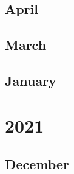 \documentclass[12pt]{article}
\begin{document}
\subsection{April}
\begin{refsection}
    \nocite{chowdhery2022palmscalinglanguagemodeling}
    \nocite{wu_inference_2025}
    \printbibliography[heading=none]
\end{refsection}

\subsection{March}
\begin{refsection}
    \nocite{ouyang_training_2022}
    \printbibliography[heading=none]
\end{refsection}


\subsection{January}
\begin{refsection}
    \nocite{wei_chain--thought_2023}
    \nocite{thoppilan_lamda_2022}
    \nocite{lewkowycz_solving_2022}
    \nocite{smith_using_2022}
    \printbibliography[heading=none]
\end{refsection}

\newpage
\section{2021}
\subsection{December}
\begin{refsection}
    \nocite{du_glam_2022}
    \nocite{nakano_webgpt_2021}
    \nocite{borgeaud_improving_2022}
    \nocite{rae_scaling_2022}
    \printbibliography[heading=none]
\end{refsection}


\end{document}
